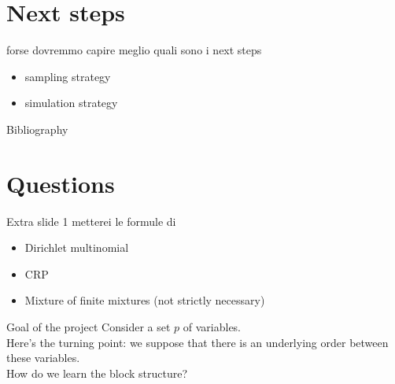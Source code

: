 \section{Next steps}
\begin{frame}

forse dovremmo capire meglio quali sono i next steps

\begin{itemize}
    \item sampling strategy
    \item simulation strategy
\end{itemize}



\centering \Huge 
\end{frame}




\begin{frame}{Bibliography}
    \nocite{bensonAdaptiveMCMCMultiple2018}
    \nocite{martinezNonparametricChangePoint2014}
    \renewcommand*{\bibfont}{\tiny}
    \printbibliography
\end{frame}

\section*{Questions}


\begin{frame}{Extra slide 1}
metterei le formule di 
\begin{itemize}
    \item Dirichlet multinomial
    \item CRP
    \item Mixture of finite mixtures (not strictly necessary)

    

\end{itemize} 
\end{frame}




\begin{frame}
    {Goal of the project}
    Consider a set $p$ of variables.\\
    Here's the turning point: we suppose that there is an underlying order between these variables.\\
    How do we learn the block structure?
\end{frame}

